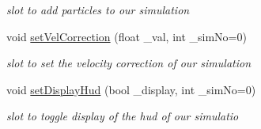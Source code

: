 \begin{DoxyCompactItemize}
\begin{DoxyCompactList}\small\item\em slot to add particles to our simulation \end{DoxyCompactList}\item 
void \hyperlink{class_open_g_l_widget_a9ca3397753dcfbc56ada94d1e91000ed}{set\-Vel\-Correction} (float \-\_\-val, int \-\_\-sim\-No=0)
\begin{DoxyCompactList}\small\item\em slot to set the velocity correction of our simulation \end{DoxyCompactList}\item 
void \hyperlink{class_open_g_l_widget_ac4dea29c4b53c1c4906dacd4aa35d975}{set\-Display\-Hud} (bool \-\_\-display, int \-\_\-sim\-No=0)
\begin{DoxyCompactList}\small\item\em slot to toggle display of the hud of our simulatio \end{DoxyCompactList}\end{DoxyCompactItemize}
